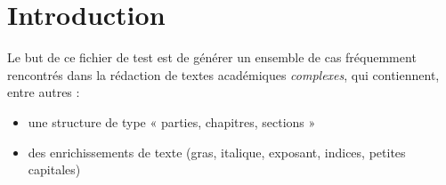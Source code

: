 \documentclass{IFSI}
\begin{document}
\maketitle

\section{Introduction}\label{introduction}

Le but de ce fichier de test est de générer un ensemble de cas
fréquemment rencontrés dans la rédaction de textes académiques
\emph{complexes}, qui contiennent, entre autres :

\begin{itemize}
\tightlist
\item
  une structure de type « parties, chapitres, sections »
\item
  des enrichissements de texte (gras, italique, exposant, indices,
  petites capitales)
\end{itemize}
\end{document}
